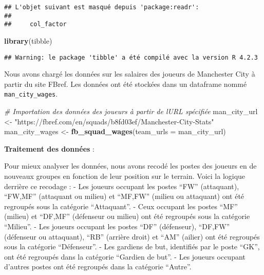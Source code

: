\documentclass[
]{article}
\newenvironment{Shaded}{\begin{snugshade}}{\end{snugshade}}
\newcommand{\AttributeTok}[1]{\textcolor[rgb]{0.13,0.29,0.53}{#1}}
\newcommand{\CommentTok}[1]{\textcolor[rgb]{0.56,0.35,0.01}{\textit{#1}}}
\newcommand{\FunctionTok}[1]{\textcolor[rgb]{0.13,0.29,0.53}{\textbf{#1}}}
\newcommand{\NormalTok}[1]{#1}
\newcommand{\OtherTok}[1]{\textcolor[rgb]{0.56,0.35,0.01}{#1}}
\newcommand{\StringTok}[1]{\textcolor[rgb]{0.31,0.60,0.02}{#1}}
\begin{document}
\begin{verbatim}
## L'objet suivant est masqué depuis 'package:readr':
## 
##     col_factor
\end{verbatim}

\begin{Shaded}
\begin{Highlighting}[]
\FunctionTok{library}\NormalTok{(tibble)}
\end{Highlighting}
\end{Shaded}

\begin{verbatim}
## Warning: le package 'tibble' a été compilé avec la version R 4.2.3
\end{verbatim}

Nous avons chargé les données sur les salaires des joueurs de Manchester
City à partir du site FBref. Les données ont été stockées dans un
dataframe nommé \texttt{man\_city\_wages}.

\begin{Shaded}
\begin{Highlighting}[]
\CommentTok{\# Importation des données des joueurs à partir de l\textquotesingle{}URL spécifiée}
\NormalTok{man\_city\_url }\OtherTok{\textless{}{-}} \StringTok{"https://fbref.com/en/squads/b8fd03ef/Manchester{-}City{-}Stats"}
\NormalTok{man\_city\_wages }\OtherTok{\textless{}{-}} \FunctionTok{fb\_squad\_wages}\NormalTok{(}\AttributeTok{team\_urls =}\NormalTok{ man\_city\_url)}
\end{Highlighting}
\end{Shaded}

\textbf{Traitement des données} :

Pour mieux analyser les données, nous avons recodé les postes des
joueurs en de nouveaux groupes en fonction de leur position sur le
terrain. Voici la logique derrière ce recodage : - Les joueurs occupant
les postes ``FW'' (attaquant), ``FW,MF'' (attaquant ou milieu) et
``MF,FW'' (milieu ou attaquant) ont été regroupés sous la catégorie
``Attaquant''. - Ceux occupant les postes ``MF'' (milieu) et ``DF,MF''
(défenseur ou milieu) ont été regroupés sous la catégorie ``Milieu''. -
Les joueurs occupant les postes ``DF'' (défenseur), ``DF,FW'' (défenseur
ou attaquant), ``RB'' (arrière droit) et ``AM'' (ailier) ont été
regroupés sous la catégorie ``Défenseur''. - Les gardiens de but,
identifiés par le poste ``GK'', ont été regroupés dans la catégorie
``Gardien de but''. - Les joueurs occupant d'autres postes ont été
regroupés dans la catégorie ``Autre''.
\end{document}
